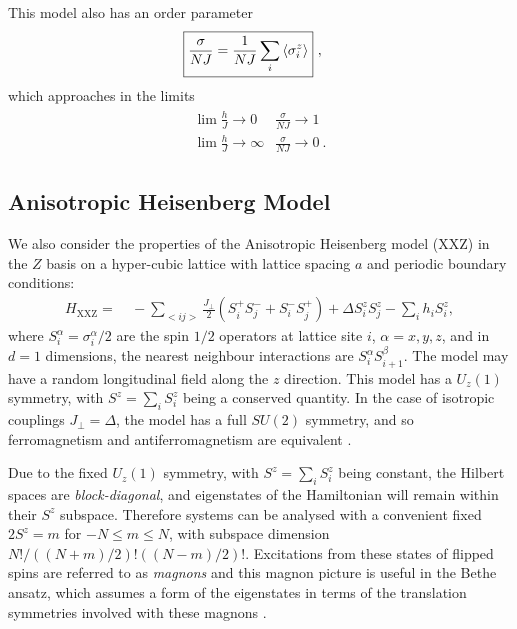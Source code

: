 \documentclass[12pt]{article}{}
\begin{document}
This model also has an order parameter
\begin{align}
  \Aboxed{\frac{\sigma}{NJ} = \frac{1}{NJ}\sum_{i} \expval{\sigma^{z}_{i}}}~, \label{eq:ising_order}
\end{align}
which approaches in the limits 
\begin{align}
  \begin{array}{cc}
    \lim \frac{h}{J} \to 0 & \frac{\sigma}{NJ} \to 1 \\
    \lim \frac{h}{J} \to \infty & \frac{\sigma}{NJ} \to 0~.
  \end{array}
\end{align}


\subsection*{\small Anisotropic Heisenberg Model}
We also consider the properties of the Anisotropic Heisenberg model (XXZ) in the $Z$ basis on a hyper-cubic lattice with lattice spacing $a$ and periodic boundary conditions:
\begin{align}
  H_{\textrm{XXZ}} =&~ -\sum_{<ij>} \frac{J_{\perp}}{2}\left(S^{+}_{i}S^{-}_{j} + S^{-}_{i}S^{+}_{j}\right) + \Delta S^{z}_{i}S^{z}_{j} - \sum_{i} h_{i}S^{z}_{i}, \label{eq:xxz_hamiltonian}
\end{align}
where $S^{\alpha}_{i} = \sigma^{\alpha}_{i}/2$ are the spin $1/2$ operators at lattice site $i$, $\alpha = x,y,z$, and in $d=1$ dimensions, the nearest neighbour interactions are $S^{\alpha}_{i}S^{\beta}_{i+1}$. The model may have a random longitudinal field along the $z$ direction. This model has a $U_z(1)$ symmetry, with $S^{z} = \sum_{i}S^{z}_{i}$ being a conserved quantity. In the case of isotropic couplings $J_{\perp} = \Delta$, the model has a full $SU(2)$ symmetry, and so ferromagnetism and antiferromagnetism are equivalent \cite{Lieb1961}.

Due to the fixed $U_z(1)$ symmetry, with $S^{z} = \sum_{i}S^{z}_{i}$ being constant, the Hilbert spaces are \emph{block-diagonal}, and eigenstates of the Hamiltonian will remain within their $S^{z}$ subspace. Therefore systems can be analysed with a convenient fixed $2S^{z} = m$ for $-N \leq m \leq N$, with subspace dimension $N!/((N+m)/2)!((N-m)/2)!$. Excitations from these states of flipped spins are referred to as \emph{magnons} and this magnon picture is useful in the Bethe ansatz, which assumes a form of the eigenstates in terms of the translation symmetries involved with these magnons \cite{Joel2013,Franchini2016}.
\end{document}
